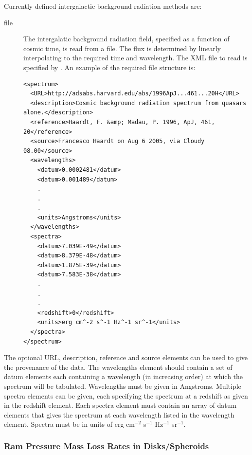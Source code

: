 Currently defined intergalactic background radiation methods are:
\begin{description}
 \item [{\normalfont \ttfamily file}] The intergalatic background radiation field, specified as a function of cosmic time, is read from a file. The flux is determined by linearly interpolating to the required time and wavelength. The XML file to read is specified by {\normalfont \ttfamily [radiationIGBFileName]}. An example of the required file structure is:
 \begin{verbatim}
<spectrum>
  <URL>http://adsabs.harvard.edu/abs/1996ApJ...461...20H</URL>
  <description>Cosmic background radiation spectrum from quasars alone.</description>
  <reference>Haardt, F. &amp; Madau, P. 1996, ApJ, 461, 20</reference>
  <source>Francesco Haardt on Aug 6 2005, via Cloudy 08.00</source>
  <wavelengths>
    <datum>0.0002481</datum>
    <datum>0.001489</datum>
    .
    .
    .
    <units>Angstroms</units>
  </wavelengths>
  <spectra>
    <datum>7.039E-49</datum>
    <datum>8.379E-48</datum>
    <datum>1.875E-39</datum>
    <datum>7.583E-38</datum>
    .
    .
    .
    <redshift>0</redshift>
    <units>erg cm^-2 s^-1 Hz^-1 sr^-1</units>
  </spectra>
</spectrum>
 \end{verbatim}
\end{description}
The optional {\normalfont \ttfamily URL}, {\normalfont \ttfamily description}, {\normalfont \ttfamily reference} and {\normalfont \ttfamily source} elements can be used to give the provenance of the data. The {\normalfont \ttfamily wavelengths} element should contain a set of {\normalfont \ttfamily datum} elements each containing a wavelength (in increasing order) at which the spectrum will be tabulated. Wavelengths must be given in Angstroms. Multiple {\normalfont \ttfamily spectra} elements can be given, each specifying the spectrum at a redshift as given in the {\normalfont \ttfamily redshift} element. Each {\normalfont \ttfamily spectra} element must contain an array of {\normalfont \ttfamily datum} elements that gives the spectrum at each wavelength listed in the {\normalfont \ttfamily wavelength} element. Spectra must be in units of erg cm$^{-2}$ s$^{-1}$ Hz$^{-1}$ sr$^{-1}$.

\subsubsection{Ram Pressure Mass Loss Rates in Disks/Spheroids}

